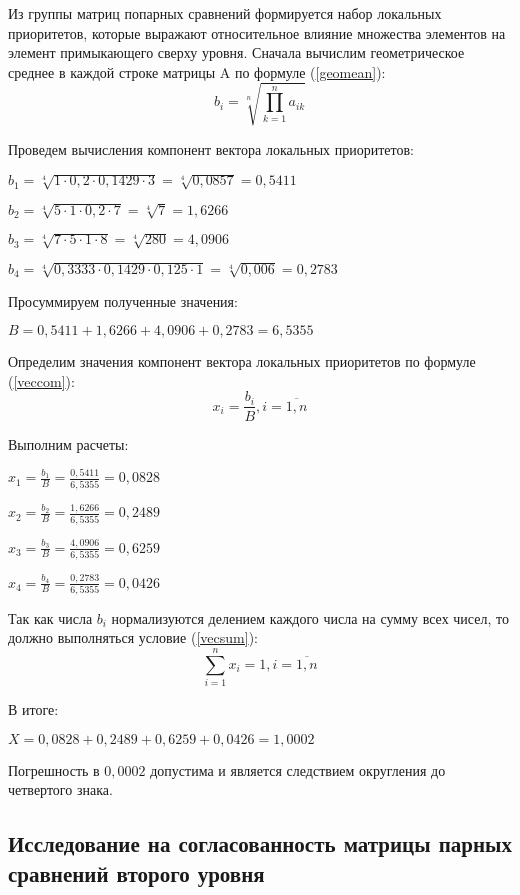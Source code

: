 Из группы матриц попарных сравнений формируется набор локальных приоритетов, которые выражают относительное влияние множества элементов на элемент примыкающего сверху уровня.
Сначала вычислим геометрическое среднее в каждой строке матрицы A по формуле (\ref{geomean}):
\begin{equation}\label{geomean}
b_i = \sqrt[n]{\prod_{k=1}^{n}a_{ik}}
\end{equation}

Проведем вычисления компонент вектора локальных приоритетов:

$b_1 = \sqrt[4]{1 \cdot 0,2 \cdot 0,1429 \cdot 3} = \sqrt[4]{0,0857} = 0,5411$

$b_2 = \sqrt[4]{5 \cdot 1 \cdot 0,2 \cdot 7} = \sqrt[4]{7} = 1,6266$

$b_3 = \sqrt[4]{7 \cdot 5 \cdot 1 \cdot 8} = \sqrt[4]{280} = 4,0906$

$b_4 = \sqrt[4]{0,3333 \cdot 0,1429 \cdot 0,125 \cdot 1} = \sqrt[4]{0,006} = 0,2783$

Просуммируем полученные значения:

$B = 0,5411 + 1,6266 + 4,0906 + 0,2783 = 6,5355$

Определим значения компонент вектора локальных приоритетов по формуле (\ref{veccom}):
\begin{equation}\label{veccom}
x_i = \frac{b_i}{B}, i = \overline{1,n}
\end{equation}

Выполним расчеты:

$x_1 = \frac{b_1}{B} =\frac{0,5411}{6,5355} = 0,0828$

$x_2 = \frac{b_2}{B} =\frac{1,6266}{6,5355} = 0,2489$

$x_3 = \frac{b_3}{B} =\frac{4,0906}{6,5355} = 0,6259$

$x_4 = \frac{b_4}{B} =\frac{0,2783}{6,5355} = 0,0426$

Так как числа $b_i$ нормализуются делением каждого числа на сумму всех чисел, то должно выполняться условие 
(\ref{vecsum}):
\begin{equation}\label{vecsum}
\sum_{i=1}^{n} x_i = 1, i = \overline{1,n}
\end{equation}

В итоге:

$X = 0,0828 + 0,2489 + 0,6259 + 0,0426 = 1,0002$

Погрешность в $0,0002$ допустима и является следствием округления до четвертого знака.

\subsection{Исследование на согласованность матрицы парных сравнений второго уровня}

